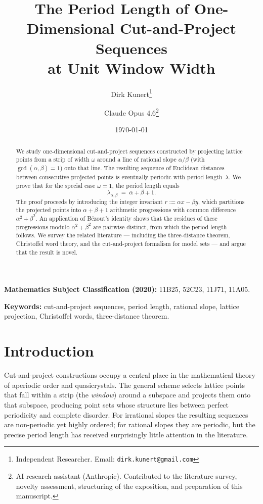 \documentclass[11pt]{article}
\title{The Period Length of One-Dimensional Cut-and-Project Sequences\\
at Unit Window Width}
\author{
    Dirk Kunert\thanks{Independent Researcher. Email: \texttt{dirk.kunert@gmail.com}}
    \and
    Claude Opus 4.6\thanks{AI research assistant (Anthropic). Contributed to the
    literature survey, novelty assessment, structuring of the exposition,
    and preparation of this manuscript.}
}
\date{\today}
\theoremstyle{plain}
\theoremstyle{definition}
\theoremstyle{remark}
\begin{document}
\maketitle

\begin{abstract}
We study one-dimensional cut-and-project sequences constructed by projecting
lattice points from a strip of width $\omega$ around a line of rational slope
$\alpha/\beta$ (with $\gcd(\alpha,\beta)=1$) onto that line.
The resulting sequence of Euclidean distances between consecutive projected
points is eventually periodic with period length~$\lambda$.
We prove that for the special case $\omega = 1$, the period length equals
\[
    \lambda_{\alpha,\beta} \;=\; \alpha + \beta + 1.
\]
The proof proceeds by introducing the integer invariant
$r := \alpha x - \beta y$, which partitions the projected points into
$\alpha + \beta + 1$ arithmetic progressions with common difference
$\alpha^2 + \beta^2$.  An application of B\'{e}zout's identity shows that the
residues of these progressions modulo $\alpha^2+\beta^2$ are pairwise distinct,
from which the period length follows.  We survey the related literature ---
including the three-distance theorem, Christoffel word theory, and the
cut-and-project formalism for model sets --- and argue that the result is novel.
\end{abstract}

\medskip
\noindent\textbf{Mathematics Subject Classification (2020):}
11B25, 52C23, 11J71, 11A05.

\medskip
\noindent\textbf{Keywords:}
cut-and-project sequences, period length, rational slope, lattice projection,
Christoffel words, three-distance theorem.

\section{Introduction}\label{sec:intro}

Cut-and-project constructions occupy a central place in the mathematical
theory of aperiodic order and quasicrystals.  The general scheme selects lattice
points that fall within a strip (the \emph{window}) around a subspace
and projects them onto that subspace, producing point sets whose structure
lies between perfect periodicity and complete disorder.  For irrational slopes
the resulting sequences are non-periodic yet highly ordered; for rational slopes
they are periodic, but the precise period length has received surprisingly
little attention in the literature.
\end{document}
